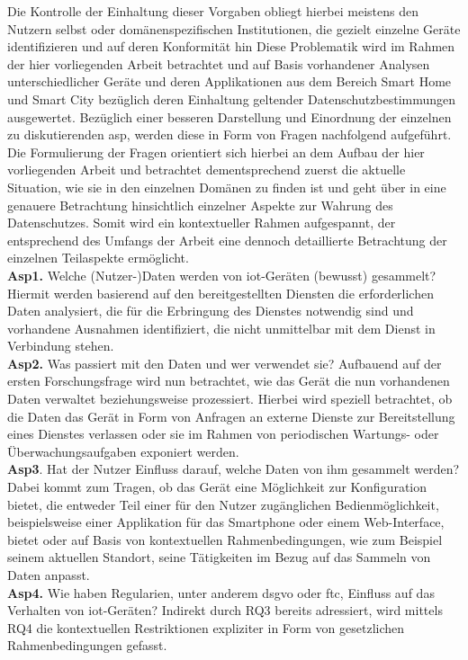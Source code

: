 \noindent Die Kontrolle der Einhaltung dieser Vorgaben obliegt hierbei meistens den Nutzern selbst oder domänenspezifischen Institutionen, die gezielt einzelne Geräte identifizieren und auf deren Konformität hin 
Diese Problematik wird im Rahmen der hier vorliegenden Arbeit betrachtet und auf Basis vorhandener Analysen unterschiedlicher Geräte und deren Applikationen aus dem Bereich Smart Home und Smart City bezüglich deren Einhaltung geltender Datenschutzbestimmungen ausgewertet. Bezüglich einer besseren Darstellung und Einordnung der einzelnen zu diskutierenden \ac{asp}, werden diese in Form von Fragen nachfolgend aufgeführt.
Die Formulierung der Fragen orientiert sich hierbei an dem Aufbau der hier vorliegenden Arbeit und betrachtet dementsprechend zuerst die aktuelle Situation, wie sie in den einzelnen Domänen zu finden ist und geht über in eine genauere Betrachtung hinsichtlich einzelner Aspekte zur Wahrung des Datenschutzes. Somit wird ein kontextueller Rahmen aufgespannt, der entsprechend des Umfangs der Arbeit eine dennoch detaillierte Betrachtung der einzelnen Teilaspekte ermöglicht.\\
\textbf{Asp1.} Welche (Nutzer-)Daten werden von \ac{iot}-Geräten (bewusst) gesammelt? Hiermit werden basierend auf den bereitgestellten Diensten die erforderlichen Daten analysiert, die für die Erbringung des Dienstes notwendig sind und vorhandene Ausnahmen identifiziert, die nicht unmittelbar mit dem Dienst in Verbindung stehen.\\
\textbf{Asp2.} Was passiert mit den Daten und wer verwendet sie? Aufbauend auf der ersten Forschungsfrage wird nun betrachtet, wie das Gerät die nun vorhandenen Daten verwaltet beziehungsweise prozessiert. Hierbei wird speziell betrachtet, ob die Daten das Gerät in Form von Anfragen an externe Dienste zur Bereitstellung eines Dienstes verlassen oder sie im Rahmen von periodischen Wartungs- oder Überwachungsaufgaben exponiert werden.\\
\textbf{Asp3}. Hat der Nutzer Einfluss darauf, welche Daten von ihm gesammelt werden? Dabei kommt zum Tragen, ob das Gerät eine Möglichkeit zur Konfiguration bietet, die entweder Teil einer für den Nutzer zugänglichen Bedienmöglichkeit, beispielsweise einer Applikation für das Smartphone oder einem Web-Interface, bietet oder auf Basis von kontextuellen Rahmenbedingungen, wie zum Beispiel seinem aktuellen Standort, seine Tätigkeiten im Bezug auf das Sammeln von Daten anpasst.\\
\textbf{Asp4.} Wie haben Regularien, unter anderem \ac{dsgvo} oder \ac{ftc}, Einfluss auf das Verhalten von \ac{iot}-Geräten? Indirekt durch RQ3 bereits adressiert, wird mittels RQ4 die kontextuellen Restriktionen expliziter in Form von gesetzlichen Rahmenbedingungen gefasst.\\
